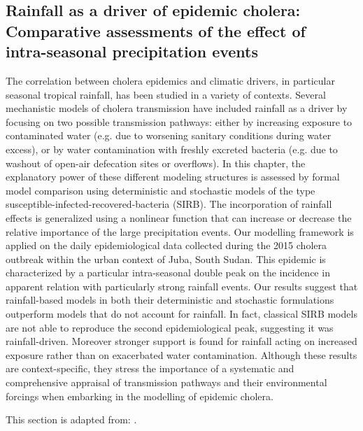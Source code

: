 \begin{fullwidth}
\chapter[Rainfall as a driver of epidemic cholera: Comparative assessments of the effect of intra-seasonal precipitation events]{Rainfall as a driver of epidemic cholera:\\Comparative assessments of the effect of\\intra-seasonal precipitation events}\label{ch:cholera-rainfall}

The correlation between cholera epidemics and climatic drivers, in particular seasonal tropical rainfall, has been studied in a variety of contexts. Several mechanistic models of cholera transmission have included rainfall as a driver by focusing on two possible transmission pathways: either by increasing exposure to contaminated water (e.g. due to worsening sanitary conditions during water excess), or by water contamination with freshly excreted bacteria (e.g. due to washout of open-air defecation sites or overflows). In this chapter, the explanatory power of these different modeling structures is assessed by formal model comparison using deterministic and stochastic models of the type susceptible-infected-recovered-bacteria (SIRB). The incorporation of rainfall effects is generalized using a nonlinear function that can increase or decrease the relative importance of the large precipitation events. Our modelling framework is applied on the daily epidemiological data collected during the 2015 cholera outbreak within the urban context of Juba, South Sudan. This epidemic is characterized by a particular intra-seasonal double peak on the incidence in apparent relation with particularly strong rainfall events. Our results suggest that rainfall-based models in both their deterministic and stochastic formulations outperform models that do not account for rainfall. In fact, classical SIRB models are not able to reproduce the second epidemiological peak, suggesting it was rainfall-driven. Moreover stronger support is found for rainfall acting on increased exposure rather than on exacerbated water contamination. Although these results are context-specific, they stress the importance of a systematic and comprehensive appraisal of transmission pathways and their environmental forcings when embarking in the modelling of epidemic cholera.

This section is adapted from:
.%
\end{fullwidth}

